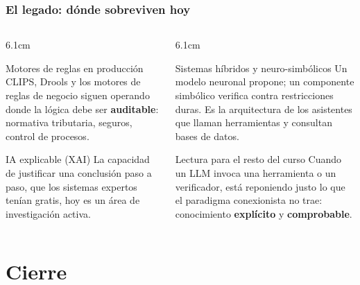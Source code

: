 \documentclass[aspectratio=169, 10pt]{beamer}
\begin{document}
\begin{frame}
\frametitle{El legado: dónde sobreviven hoy}
\begin{columns}[T]
\begin{column}{6.1cm}
\begin{exampleblock}{Motores de reglas en producción}
CLIPS, Drools y los motores de reglas de negocio siguen operando donde la l\'ogica debe ser \textbf{auditable}: normativa tributaria, seguros, control de procesos.
\end{exampleblock}
\begin{exampleblock}{IA explicable (XAI)}
La capacidad de justificar una conclusi\'on paso a paso, que los sistemas expertos ten\'ian gratis, hoy es un \'area de investigaci\'on activa.
\end{exampleblock}
\end{column}
\begin{column}{6.1cm}
\begin{exampleblock}{Sistemas híbridos y neuro-simbólicos}
Un modelo neuronal propone; un componente simb\'olico verifica contra restricciones duras. Es la arquitectura de los asistentes que llaman herramientas y consultan bases de datos.
\end{exampleblock}
\begin{block}{Lectura para el resto del curso}
Cuando un LLM invoca una herramienta o un verificador, est\'a reponiendo justo lo que el paradigma conexionista no trae: conocimiento \textbf{expl\'icito} y \textbf{comprobable}.
\end{block}
\end{column}
\end{columns}
\end{frame}

\section{Cierre}
\end{document}
